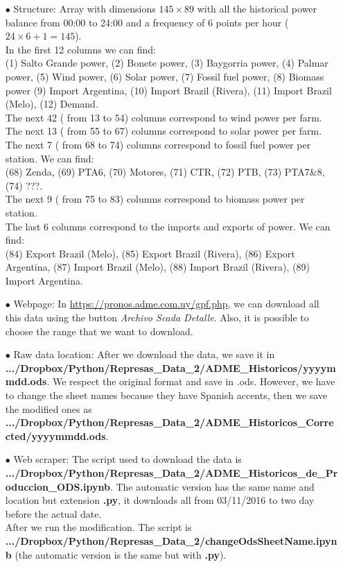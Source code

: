 \documentclass[12pt]{article}
\theoremstyle{definition}
\theoremstyle{remark}
\begin{document}
\begin{enumerate}

\item[$\bullet$] Structure: Array with dimensions $145\times89$ with all the historical power balance from 00:00 to 24:00 and a frequency of 6 points per hour ($24\times6+1=145$).\\
In the first 12 columns we can find:\\
{\color{blue} (1) Salto Grande power, (2) Bonete power, (3) Baygorria power, (4) Palmar power, (5) Wind power, (6) Solar power, (7) Fossil fuel power, (8) Biomass power (9) Import Argentina, (10) Import Brazil (Rivera), (11) Import Brazil (Melo), (12) Demand}.\\
The next 42 ({\color{blue} from 13 to 54}) columns correspond to wind power per farm.\\
The next 13 ({\color{blue} from 55 to 67}) columns correspond to solar power per farm.\\
The next 7 ({\color{blue} from 68 to 74}) columns correspond to fossil fuel power per station. We can find:\\
{\color{blue} (68) Zenda, (69) PTA6, (70) Motores, (71) CTR, (72) PTB, (73) PTA7\&8, (74) ???}.\\
The next 9 ({\color{blue} from 75 to 83}) columns correspond to biomass power per station.\\
The last 6 columns correspond to the imports and exports of power. We can find:\\
{\color{blue} (84) Export Brazil (Melo), (85) Export Brazil (Rivera), (86) Export Argentina, (87) Import Brazil (Melo), (88) Import Brazil (Rivera), (89) Import Argentina}.\\

\item[$\bullet$] Webpage: In {\color{blue} \url{https://pronos.adme.com.uy/gpf.php}}, we can download all this data using the button \textit{Archivo Scada Detalle}. Also, it is possible to choose the range that we want to download.

\item[$\bullet$] Raw data location: After we download the data, we save it in \textbf{.../Dropbox/Python/Represas\_Data\_2/ADME\_Historicos/yyyymmdd.ods}. We respect the original format and save in .ods. However, we have to change the sheet names because they have Spanish accents, then we save the modified ones as \textbf{.../Dropbox/Python/Represas\_Data\_2/ADME\_Historicos\_Corrected/yyyymmdd.ods}.

\item[$\bullet$] Web scraper: The script used to download the data is \textbf{.../Dropbox/Python/Represas\_Data\_2/ADME\_Historicos\_de\_Produccion\_ODS.ipynb}. The automatic version has the same name and location but extension \textbf{.py}, it downloads all from 03/11/2016 to two day before the actual date.\\
After we run the modification. The script is \textbf{.../Dropbox/Python/Represas\_Data\_2/changeOdsSheetName.ipynb} (the automatic version is the same but with \textbf{.py}).

\end{enumerate}
\end{document}
